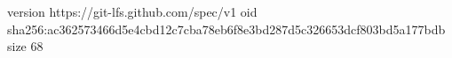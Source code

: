 version https://git-lfs.github.com/spec/v1
oid sha256:ac362573466d5e4cbd12c7cba78eb6f8e3bd287d5c326653dcf803bd5a177bdb
size 68
